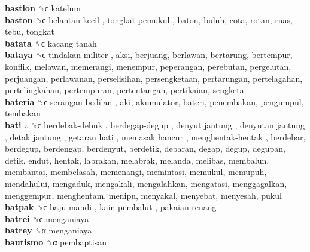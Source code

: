 \textbf{bastion} ␝ϲ  katelum  \\
\textbf{baston} ␝ϲ   belantan kecil ,  tongkat pemukul , baton, buluh, cota, rotan, ruas, tebu, tongkat  \\
\textbf{batata} ␝ϲ   kacang tanah   \\
\textbf{bataya} ␝ϲ   tindakan militer , aksi, berjuang, berlawan, bertarung, bertempur, konflik, melawan, memerangi, menempur, peperangan, perebutan, pergelutan, perjuangan, perlawanan, perselisihan, persengketaan, pertarungan, pertelagahan, pertelingkahan, pertempuran, pertentangan, pertikaian, sengketa  \\
\textbf{bateria} ␝ϲ   serangan bedilan , aki, akumulator, bateri, penembakan, pengumpul, tembakan  \\
\textbf{bati} \emph{v}  ␝ϲ   berdebak-debuk ,  berdegap-degup ,  denyut jantung ,  denyutan jantung ,  detak jantung ,  getaran hati ,  memasak hancur ,  menghentak-hentak , berdebar, berdegup, berdengap, berdenyut, berdetik, debaran, degap, degup, degupan, detik, endut, hentak, labrakan, melabrak, melanda, melibas, membalun, membantai, membelasah, memenangi, memintasi, memukul, memupuh, mendahului, mengaduk, mengakali, mengalahkan, mengatasi, menggagalkan, menggempur, menghentam, menipu, menyakal, menyebat, menyesah, pukul  \\
\textbf{batpak} ␝ϲ   baju mandi ,  kain pembalut ,  pakaian renang   \\
\textbf{batrei} ␝ϲ  menganiaya  \\
\textbf{batrey} ␝α  menganiaya  \\
\textbf{bautismo} ␝α  pembaptisan  \\
